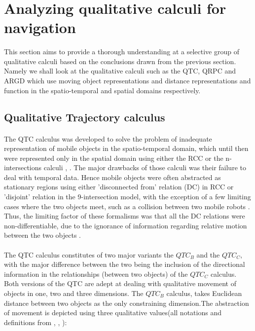 	\section{Analyzing qualitative calculi for navigation}
	\paragraph{} This section aims to provide a thorough understanding at a selective group of qualitative calculi based on the conclusions drawn from the previous section. Namely we shall look at the qualitative calculi such as the QTC, QRPC and ARGD which use moving object representations and distance representations and function in the spatio-temporal and spatial domains respectively.
	\subsection{Qualitative Trajectory calculus}
	\paragraph{}The QTC calculus was developed to solve the problem of inadequate representation of mobile objects in the spatio-temporal domain, which until then were represented only in the spatial domain using either the RCC or the n-intersections calculi \cite{van2006qualitative}, \cite{van2005qualitative}. The major drawbacks of those calculi was their failure to deal with temporal data. Hence mobile objects were often abstracted as stationary regions using either 'disconnected from' relation (DC) in RCC or 'disjoint' relation in the 9-intersection model, with the exception of a few limiting cases where the two objects meet, such as a collision between two mobile robots \cite{van2004representing}. Thus, the limiting factor of these formalisms was that all the DC relations were non-differentiable, due to the ignorance of information regarding relative motion between the two objects .
	\paragraph{}The QTC calculus constitutes of two major variants the $QTC_B$ and the $QTC_C$, with the major difference between the two being the inclusion of the directional information in the relationships (between two objects) of the $QTC_C$ calculus. Both versions of the QTC are adept at dealing with qualitative movement of objects in one, two and three dimensions. The $QTC_B$ calculus, takes Euclidean distance between two objects as the only constraining dimension.The abstraction of movement is depicted using three qualitative values(all notations and definitions from \cite{van2004representing}, \cite{van2006qualitative}, \cite{van2005qualitative}):
	
